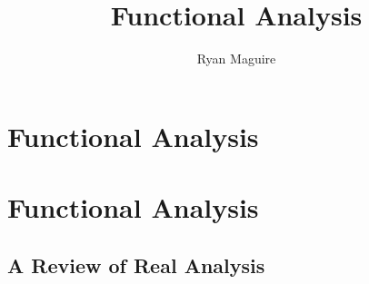 \documentclass[crop=false,class=book,oneside]{standalone}
\begin{document}
    \ifx\ifmathcourses\undefined
        \title{Functional Analysis}
        \author{Ryan Maguire}
        \date{\vspace{-5ex}}
        \maketitle
        \tableofcontents
        \clearpage
        \setcounter{chapter}{13}
        \chapter{Functional Analysis}
    \else
        \chapter{Functional Analysis}
    \fi
    \section{A Review of Real Analysis}
\end{document}
